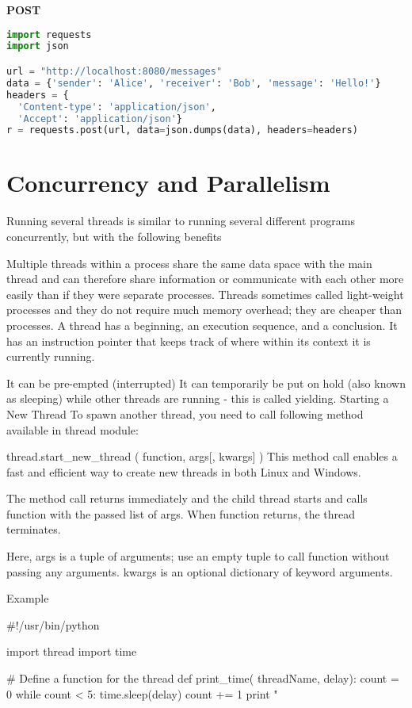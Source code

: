 \textbf{POST}

\begin{lstlisting}[language=Python]
import requests
import json

url = "http://localhost:8080/messages"
data = {'sender': 'Alice', 'receiver': 'Bob', 'message': 'Hello!'}
headers = {
  'Content-type': 'application/json',
  'Accept': 'application/json'}
r = requests.post(url, data=json.dumps(data), headers=headers)
\end{lstlisting}

\section{Concurrency and Parallelism}

Running several threads is similar to running several different programs concurrently, but with the following benefits

Multiple threads within a process share the same data space with the main thread and can therefore share information or communicate with each other more easily than if they were separate processes.
Threads sometimes called light-weight processes and they do not require much memory overhead; they are cheaper than processes.
A thread has a beginning, an execution sequence, and a conclusion. It has an instruction pointer that keeps track of where within its context it is currently running.

It can be pre-empted (interrupted)
It can temporarily be put on hold (also known as sleeping) while other threads are running - this is called yielding.
Starting a New Thread
To spawn another thread, you need to call following method available in thread module:

thread.start_new_thread ( function, args[, kwargs] )
This method call enables a fast and efficient way to create new threads in both Linux and Windows.

The method call returns immediately and the child thread starts and calls function with the passed list of args. When function returns, the thread terminates.

Here, args is a tuple of arguments; use an empty tuple to call function without passing any arguments. kwargs is an optional dictionary of keyword arguments.

Example

#!/usr/bin/python

import thread
import time

# Define a function for the thread
def print_time( threadName, delay):
   count = 0
   while count < 5:
      time.sleep(delay)
      count += 1
      print "%

